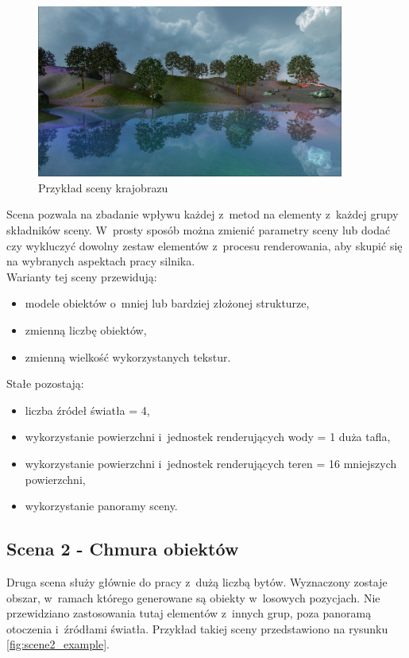\documentclass[a4paper,twoside,12pt]{book}
\begin{document}
\begin{figure}[H]
    \centering
    \includegraphics[width=0.9\textwidth]{res/scene1_example.png}
    \caption{Przykład sceny krajobrazu}
    \label{fig:scene1_example}
\end{figure}

Scena pozwala na zbadanie wpływu każdej z~metod na elementy z~każdej grupy składników sceny. W~prosty sposób można zmienić parametry sceny lub dodać czy wykluczyć dowolny zestaw elementów z~procesu renderowania, aby skupić się na wybranych aspektach pracy silnika. \\
Warianty tej sceny przewidują:
\begin{itemize}
    \item modele obiektów o~mniej lub bardziej złożonej strukturze,
    \item zmienną liczbę obiektów,
    \item zmienną wielkość wykorzystanych tekstur.
\end{itemize}

\vbox{}

Stałe pozostają:
\begin{itemize}
    \item liczba źródeł światła = 4,
    \item wykorzystanie powierzchni i~jednostek renderujących wody = 1 duża tafla,
    \item wykorzystanie powierzchni i~jednostek renderujących teren = 16 mniejszych powierzchni,
    \item wykorzystanie panoramy sceny.
\end{itemize}

\subsection{Scena 2 - Chmura obiektów}
Druga scena służy głównie do pracy z~dużą liczbą bytów. Wyznaczony zostaje obszar, w~ramach którego generowane są obiekty w~losowych pozycjach. Nie przewidziano zastosowania tutaj elementów z~innych grup, poza panoramą otoczenia i~źródłami światła. Przykład takiej sceny przedstawiono na rysunku \ref{fig:scene2_example}.
\end{document}
